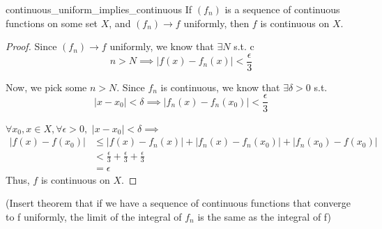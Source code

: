 \begin{thm}{}{continuous_uniform_implies_continuous}
If $(f_n)$ is a sequence of continuous functions on some set $X$, and $(f_n) \to f$ uniformly, then $f$ is continuous on $X$.
\newline
\begin{proof}
Since $(f_n)\to f$ uniformly, we know that $\exists N$ s.t. 
c\begin{equation*}
n > N \implies |f(x) - f_n(x)| < \frac{\epsilon}{3}
\end{equation*}

Now, we pick some $n>N$. Since $f_n$ is continuous, we know that $\exists \delta > 0$ s.t. 
\begin{equation*}
|x - x_0| < \delta \implies |f_n(x) - f_n(x_0)| < \frac{\epsilon}{3}
\end{equation*}

$\forall x_0,x \in X, \forall \epsilon > 0,$
\newline
$|x - x_0| < \delta \implies$ 
\begin{align*}
|f(x) - f(x_0)| &\leq |f(x) - f_n(x)| + |f_n(x) - f_n(x_0)| + |f_n(x_0) - f(x_0)| \\
		   &< \frac{\epsilon}{3} + \frac{\epsilon}{3} + \frac{\epsilon}{3} \\
		   &= \epsilon
\end{align*}
Thus, $f$ is continuous on $X$.




\end{proof}
\end{thm}
(Insert theorem that if we have a sequence of continuous functions that converge to f uniformly, the limit of the integral of $f_n$ is the same as the integral of f)